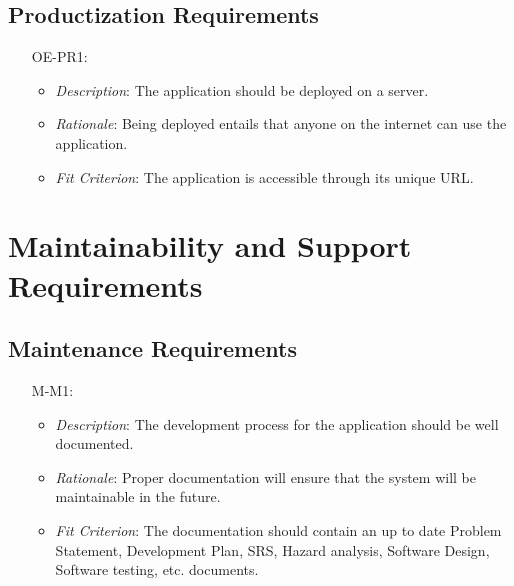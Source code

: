 \documentclass[12pt]{article}
\begin{document}
\subsection{Productization Requirements}
\noindent \begin{itemize}
    \item[OE-PR1:] 
        \begin{itemize}
            \item \textit{Description}: The application should be deployed on a server.
            \item \textit{Rationale}: Being deployed entails that anyone on the internet can use the application.
            \item \textit{Fit Criterion}: The application is accessible through its unique URL.
        \end{itemize}
\end{itemize}



\section{Maintainability and Support Requirements}
\subsection{Maintenance Requirements}
\noindent \begin{itemize}
    \item[M-M1:] 
        \begin{itemize}
            \item \textit{Description}:  The development process for the application should be well documented.
            \item \textit{Rationale}: Proper documentation will ensure that the system will be maintainable in the future.
            \item \textit{Fit Criterion}: The documentation should contain an up to date Problem Statement, Development Plan, SRS, Hazard analysis, Software Design, Software testing, etc. documents. 
        \end{itemize}
\end{itemize}
\end{document}
